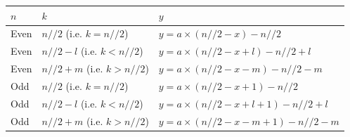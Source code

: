 \documentclass[12pt, twoside]{article}
\begin{document}
\begin{tabular}{|l ||l ||l|}
	\hline
	\textbf{$n$} & \textbf{$k$} & \textbf{$y$} \\
	\hline
	Even & $n//2$ \space(i.e. $k = n//2$) & $y = a \times (n//2-x) - n//2$ \\
	\hline
	Even & $n//2 - l$ \space(i.e. $k < n//2$) & $y = a \times (n//2-x+l ) - n//2 + l$ \\
	\hline
	Even & $n//2 + m $ (i.e. $k > n//2$) & $y = a \times (n//2-x-m ) - n//2 -m$ \\
	\hline
	Odd & $n//2 $ \space(i.e. $k = n//2$) & $y = a \times (n//2-x +1) - n//2$ \\
	\hline
	Odd & $n//2 - l $ \space(i.e. $k < n//2$) & $y = a \times (n//2-x+l +1) - n//2 + l$ \\
	\hline
	Odd & $n//2 + m $ (i.e. $k > n//2$)  & $y = a \times (n//2-x-m +1 ) - n//2 -m $ \\
	\hline
\end{tabular}
\end{document}
